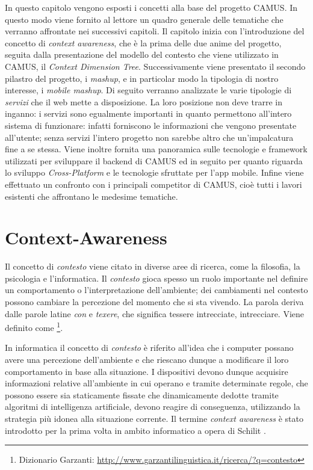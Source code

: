 In questo capitolo vengono esposti i concetti alla base del progetto CAMUS. In questo modo viene fornito al lettore un quadro generale delle tematiche che verranno affrontate nei successivi capitoli. Il capitolo inizia con l'introduzione del concetto di \emph{context awareness}, che è la prima delle due anime del progetto, seguita dalla presentazione del modello del contesto che viene utilizzato in CAMUS, il \emph{Context Dimension Tree}. Successivamente viene presentato il secondo pilastro del progetto, i \emph{mashup}, e in particolar modo la tipologia di nostro interesse, i \emph{mobile mashup}. Di seguito verranno analizzate le varie tipologie di \emph{servizi} che il web mette a disposizione. La loro posizione non deve trarre in inganno: i servizi sono egualmente importanti in quanto permettono all'intero sistema di funzionare: infatti forniscono le informazioni che vengono presentate all'utente; senza servizi l'intero progetto non sarebbe altro che un'impalcatura fine a se stessa. Viene inoltre fornita una panoramica sulle tecnologie e framework utilizzati per sviluppare il backend di CAMUS ed in seguito per quanto riguarda lo sviluppo \emph{Cross-Platform} e le tecnologie sfruttate per l'app mobile. Infine viene effettuato un confronto con i principali competitor di CAMUS, cioè tutti i lavori esistenti che affrontano le medesime tematiche.

\section{Context-Awareness\label{sec:context-awareness}}

Il concetto di \emph{contesto} viene citato in diverse aree di ricerca, come la filosofia, la psicologia e l'informatica. Il \emph{contesto} gioca spesso un ruolo importante nel definire un comportamento o l'interpretazione dell'ambiente; dei cambiamenti nel contesto possono cambiare la percezione del momento che si sta vivendo. La parola  deriva dalle parole latine \emph{con} e \emph{texere}, che significa tessere intrecciate, intrecciare. Viene definito come \footnote{Dizionario Garzanti: \url{http://www.garzantilinguistica.it/ricerca/?q=contesto}}.

In informatica il concetto di \emph{contesto} è riferito all'idea che i computer possano avere una percezione dell'ambiente e che riescano dunque a modificare il loro comportamento in base alla situazione. I dispositivi devono dunque acquisire informazioni relative all'ambiente in cui operano e tramite determinate regole, che possono essere sia staticamente fissate che dinamicamente dedotte tramite algoritmi di intelligenza artificiale, devono reagire di conseguenza, utilizzando la strategia più idonea alla situazione corrente. Il termine \emph{context awareness} è stato introdotto per la prima volta in ambito informatico a opera di Schilit \cite{schilit1994context}\cite{schilit1994disseminating}.

